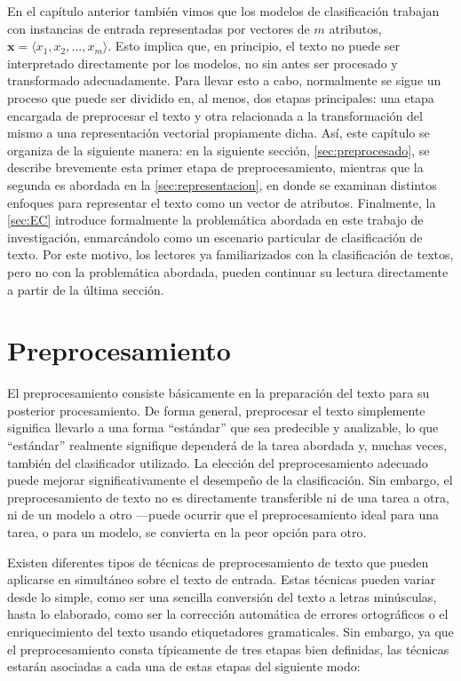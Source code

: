 En el capítulo anterior también vimos que los modelos de clasificación trabajan con instancias de entrada representadas por vectores de $m$ atributos, $\pmb{x}=\langle x_1,x_2,\dots,x_m\rangle$.
Esto implica que, en principio, el texto no puede ser interpretado directamente por los modelos, no sin antes ser procesado y transformado adecuadamente. Para llevar esto a cabo, normalmente se sigue un proceso que puede ser dividido en, al menos, dos etapas principales: una etapa encargada de preprocesar el texto y otra relacionada a la transformación del mismo a una representación vectorial propiamente dicha. Así, este capítulo se organiza de la siguiente manera: en la siguiente sección, \autoref{sec:preprocesado}, se describe brevemente esta primer etapa de preprocesamiento, mientras que la segunda es abordada en la \autoref{sec:representacion}, en donde se examinan distintos enfoques para representar el texto como un vector de atributos. Finalmente, la \autoref{sec:EC} introduce formalmente la problemática abordada en este trabajo de investigación, enmarcándolo como un escenario particular de clasificación de texto.
Por este motivo, los lectores ya familiarizados con la clasificación de textos, pero no con la problemática abordada, pueden continuar su lectura directamente a partir de la última sección.

\section{Preprocesamiento}
\label{sec:preprocesado}

El preprocesamiento consiste básicamente en la preparación del texto para su posterior procesamiento.
De forma general, preprocesar el texto simplemente significa llevarlo a una forma ``estándar'' que sea predecible y analizable, lo que ``estándar'' realmente signifique dependerá de  la tarea abordada y, muchas veces, también del clasificador utilizado.
La elección del preprocesamiento adecuado puede mejorar significativamente el desempeño de la clasificación\cite{uysal2014impact,hacohen2020influence}.
Sin embargo, el preprocesamiento de texto no es directamente transferible ni de una tarea a otra, ni de un modelo a otro ---puede ocurrir que el preprocesamiento ideal para una tarea, o para un modelo, se convierta en la peor opción para otro.

Existen diferentes tipos de técnicas de preprocesamiento de texto que pueden aplicarse en simultáneo sobre el texto de entrada. Estas técnicas pueden variar desde lo simple, como ser una sencilla conversión del texto a letras minúsculas, hasta lo elaborado, como ser la corrección automática de errores ortográficos o el enriquecimiento del texto usando etiquetadores gramaticales.
Sin embargo, ya que el preprocesamiento consta típicamente de tres etapas bien definidas, las técnicas estarán asociadas a cada una de estas etapas del siguiente modo: 

